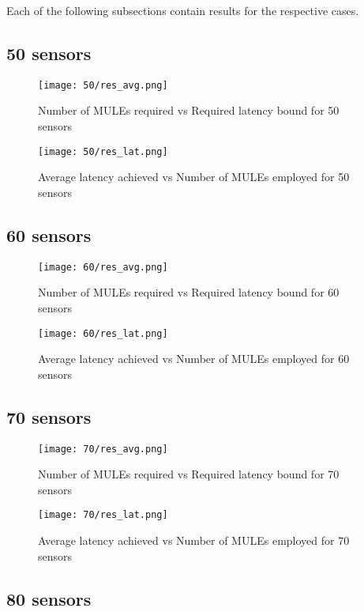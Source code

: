 Each of the following subsections contain results for the respective cases.

\subsection{50 sensors}

\begin{figure}[H]
\texttt{[image: 50/res\_avg.png]}
\label{fig:avg50}
\caption{Number of MULEs required vs Required latency bound for 50 sensors}
\end{figure}
\begin{figure}[H]
\texttt{[image: 50/res\_lat.png]}
\label{fig:lat50}
\caption{Average latency achieved vs Number of MULEs employed for 50 sensors}
\end{figure}

\subsection{60 sensors}

\begin{figure}[H]
\texttt{[image: 60/res\_avg.png]}
\label{fig:avg60}
\caption{Number of MULEs required vs Required latency bound for 60 sensors}
\end{figure}
\begin{figure}[H]
\texttt{[image: 60/res\_lat.png]}
\label{fig:lat60}
\caption{Average latency achieved vs Number of MULEs employed for 60 sensors}
\end{figure}

\subsection{70 sensors}

\begin{figure}[H]
\texttt{[image: 70/res\_avg.png]}
\label{fig:avg70}
\caption{Number of MULEs required vs Required latency bound for 70 sensors}
\end{figure}
\begin{figure}[H]
\texttt{[image: 70/res\_lat.png]}
\label{fig:lat70}
\caption{Average latency achieved vs Number of MULEs employed for 70 sensors}
\end{figure}

\subsection{80 sensors}

